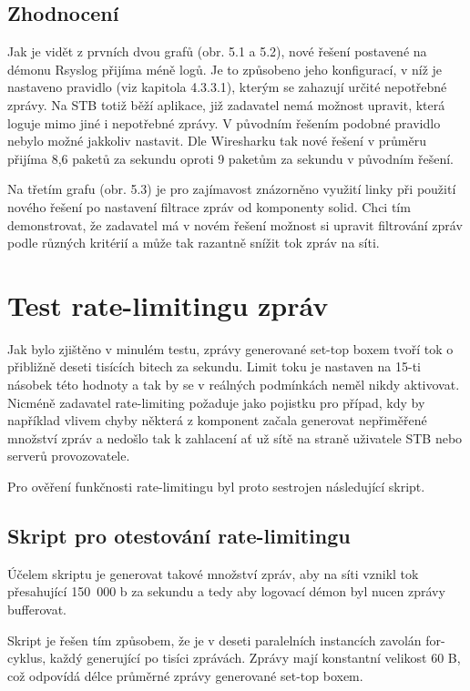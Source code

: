 \documentclass[thesis=B,czech]{FITthesis}[2012/06/26]
\begin{document}
\subsection*{Zhodnocení}
Jak je vidět z prvních dvou grafů (obr. 5.1 a 5.2), nové řešení postavené na démonu Rsyslog přijíma méně logů. Je to způsobeno jeho konfigurací, v níž je nastaveno pravidlo (viz kapitola 4.3.3.1), kterým se zahazují určité nepotřebné zprávy. Na STB totiž běží aplikace, již zadavatel nemá možnost upravit, která loguje mimo jiné i nepotřebné zprávy. V původním řešením podobné pravidlo nebylo možné jakkoliv nastavit.
Dle Wiresharku tak nové řešení v průměru přijíma 8,6 paketů za sekundu oproti 9 paketům za sekundu v původním řešení.

Na třetím grafu (obr. 5.3) je pro zajímavost znázorněno využití linky při použití nového řešení po nastavení filtrace zpráv od komponenty solid.
Chci tím demonstrovat, že zadavatel má v novém řešení možnost si upravit filtrování zpráv podle různých kritérií a může tak razantně snížit tok zpráv na síti.

\section{Test rate-limitingu zpráv}
Jak bylo zjištěno v minulém testu, zprávy generované set-top boxem tvoří tok o přibližně deseti tisících bitech za sekundu. Limit toku je nastaven na 15-ti násobek této hodnoty a tak by se v reálných podmínkách neměl nikdy aktivovat. Nicméně zadavatel rate-limiting požaduje jako pojistku pro případ, kdy by například vlivem chyby některá z komponent začala generovat nepřiměřené množství zpráv a nedošlo tak k zahlacení ať už sítě na straně uživatele STB nebo serverů provozovatele.

Pro ověření funkčnosti rate-limitingu byl proto sestrojen následující skript.

\subsection{Skript pro otestování rate-limitingu}
Účelem skriptu je generovat takové množství zpráv, aby na síti vznikl tok přesahující 150~000 b za sekundu a tedy aby logovací démon byl nucen zprávy bufferovat.

Skript je řešen tím způsobem, že je v deseti paralelních instancích zavolán for-cyklus, každý generující po tisíci zprávách.
Zprávy mají konstantní velikost 60 B, což odpovídá délce průměrné zprávy generované set-top boxem.
\end{document}
